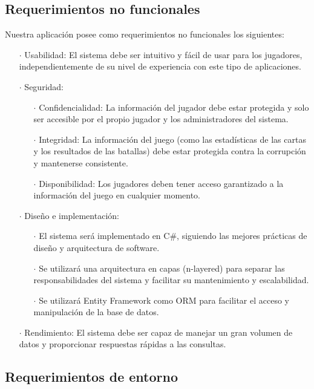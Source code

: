 \subsection{Requerimientos no funcionales}

Nuestra aplicación posee como requerimientos no funcionales los siguientes:

\begin{enumerate}
  \item[\(\cdot\)] Usabilidad: El sistema debe ser intuitivo y fácil de usar para los jugadores, independientemente de su nivel de experiencia con este tipo de aplicaciones.
  \item[\(\cdot\)] Seguridad:
    \begin{enumerate}
      \item[\(\cdot\)] Confidencialidad: La información del jugador debe estar protegida y solo ser accesible por el propio jugador y los administradores del sistema.
      \item[\(\cdot\)] Integridad: La información del juego (como las estadísticas de las cartas y los resultados de las batallas) debe estar protegida contra la corrupción y mantenerse consistente.
      \item[\(\cdot\)] Disponibilidad: Los jugadores deben tener acceso garantizado a la información del juego en cualquier momento.
    \end{enumerate}
  \item[\(\cdot\)] Diseño e implementación:
    \begin{enumerate}
      \item[\(\cdot\)] El sistema será implementado en C\#, siguiendo las mejores prácticas de diseño y arquitectura de software.
      \item[\(\cdot\)] Se utilizará una arquitectura en capas (n-layered) para separar las responsabilidades del sistema y facilitar su mantenimiento y escalabilidad.
      \item[\(\cdot\)] Se utilizará Entity Framework como ORM para facilitar el acceso y manipulación de la base de datos.
    \end{enumerate}
  \item[\(\cdot\)] Rendimiento: El sistema debe ser capaz de manejar un gran volumen de datos y proporcionar respuestas rápidas a las consultas.
\end{enumerate}

\subsection{Requerimientos de entorno}


